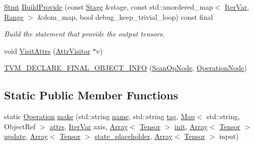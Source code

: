 \begin{DoxyCompactItemize}
\hyperlink{classtvm_1_1tir_1_1Stmt}{Stmt} \hyperlink{classtvm_1_1te_1_1ScanOpNode_a315db905697bc7377d2a84372179b52c}{Build\+Provide} (const \hyperlink{classtvm_1_1te_1_1Stage}{Stage} \&stage, const std\+::unordered\+\_\+map$<$ \hyperlink{classtvm_1_1tir_1_1IterVar}{Iter\+Var}, \hyperlink{classtvm_1_1Range}{Range} $>$ \&dom\+\_\+map, bool debug\+\_\+keep\+\_\+trivial\+\_\+loop) const final
\begin{DoxyCompactList}\small\item\em Build the statement that provide the output tensors. \end{DoxyCompactList}\item 
void \hyperlink{classtvm_1_1te_1_1ScanOpNode_a6a6b44111b5558c66399dd4408eccc69}{Visit\+Attrs} (\hyperlink{classtvm_1_1AttrVisitor}{Attr\+Visitor} $\ast$v)
\item 
\hyperlink{classtvm_1_1te_1_1ScanOpNode_a3382d723a86a2d52543754411c204a42}{T\+V\+M\+\_\+\+D\+E\+C\+L\+A\+R\+E\+\_\+\+F\+I\+N\+A\+L\+\_\+\+O\+B\+J\+E\+C\+T\+\_\+\+I\+N\+FO} (\hyperlink{classtvm_1_1te_1_1ScanOpNode}{Scan\+Op\+Node}, \hyperlink{classtvm_1_1te_1_1OperationNode}{Operation\+Node})
\end{DoxyCompactItemize}
\subsection*{Static Public Member Functions}
\begin{DoxyCompactItemize}
\item 
static \hyperlink{classtvm_1_1te_1_1Operation}{Operation} \hyperlink{classtvm_1_1te_1_1ScanOpNode_a628864f424101ef410197bc6ab594548}{make} (std\+::string \hyperlink{classtvm_1_1te_1_1OperationNode_ad2fd6f140257f7b3c311f88374fa74d2}{name}, std\+::string \hyperlink{classtvm_1_1te_1_1OperationNode_ae6ac4336e7dc2df84f128fc97a6cdb9b}{tag}, \hyperlink{classtvm_1_1Map}{Map}$<$ std\+::string, Object\+Ref $>$ \hyperlink{classtvm_1_1te_1_1OperationNode_a009ebd67a59953ec9a587f9724afd538}{attrs}, \hyperlink{classtvm_1_1tir_1_1IterVar}{Iter\+Var} axis, \hyperlink{classtvm_1_1Array}{Array}$<$ \hyperlink{classtvm_1_1te_1_1Tensor}{Tensor} $>$ \hyperlink{classtvm_1_1te_1_1ScanOpNode_a729243cd385db2e3f74c3a92a44db935}{init}, \hyperlink{classtvm_1_1Array}{Array}$<$ \hyperlink{classtvm_1_1te_1_1Tensor}{Tensor} $>$ \hyperlink{classtvm_1_1te_1_1ScanOpNode_ace2bf7e43cd4197324ec6363626fc60a}{update}, \hyperlink{classtvm_1_1Array}{Array}$<$ \hyperlink{classtvm_1_1te_1_1Tensor}{Tensor} $>$ \hyperlink{classtvm_1_1te_1_1ScanOpNode_a69105f6a84dd4fb912a16bfaa68aebf6}{state\+\_\+placeholder}, \hyperlink{classtvm_1_1Array}{Array}$<$ \hyperlink{classtvm_1_1te_1_1Tensor}{Tensor} $>$ input)
\end{DoxyCompactItemize}
